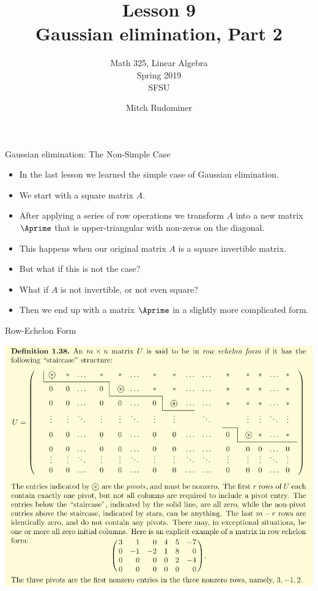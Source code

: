 \documentclass{beamer}
\title{Lesson 9\\ Gaussian elimination, Part 2}
\subtitle{Math 325, Linear Algebra \\ Spring 2019 \\ SFSU}
\author{Mitch Rudominer}
\date{}
\begin{document}
\begin{frame}
  \titlepage
\end{frame}


\begin{frame}{Gaussian elimination: The Non-Simple Case}

\begin{itemize}
\item In the last lesson we learned the simple case of Gaussian elimination.
\item We start with a square matrix $A$.
\item After applying a series of row operations we transform $A$
into a new matrix $\Aprime$ that is upper-triangular with non-zeros on the diagonal.
\item This happens when our original matrix $A$ is a square invertible matrix.
\item But what if this is not the case?
\item What if $A$ is not invertible, or not even square?
\item Then we end up with a matrix $\Aprime$ in a slightly more complicated form.
\end{itemize}

\end{frame}



\begin{frame}{Row-Echelon Form}

\begin{center}
\includegraphics[scale=0.25]{row-echelon-form}
\end{center}

\end{frame}
\end{document}
